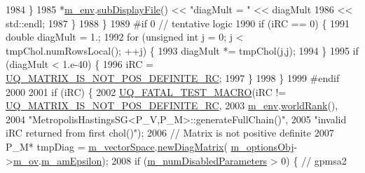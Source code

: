 \begin{DoxyCode}
{{1984             \}
1985             *\hyperlink{class_q_u_e_s_o_1_1_metropolis_hastings_s_g_ac8ea061e55b920e0c8f9bce5c3f20e52}{m\_env}.\hyperlink{class_q_u_e_s_o_1_1_base_environment_a8a0064746ae8dddfece4229b9ad374d6}{subDisplayFile}() << \textcolor{stringliteral}{"diagMult = "} << diagMult
1986                                     << std::endl;
1987           \}
1988         \}
1989 \textcolor{preprocessor}{#if 0 // tentative logic}
1990 \textcolor{preprocessor}{}        \textcolor{keywordflow}{if} (iRC == 0) \{
1991           \textcolor{keywordtype}{double} diagMult = 1.;
1992           \textcolor{keywordflow}{for} (\textcolor{keywordtype}{unsigned} \textcolor{keywordtype}{int} j = 0; j < tmpChol.numRowsLocal(); ++j) \{
1993             diagMult *= tmpChol(j,j);
1994           \}
1995           \textcolor{keywordflow}{if} (diagMult < 1.e-40) \{
1996             iRC = \hyperlink{namespace_q_u_e_s_o_a677863cd32092584175760250f39e8bb}{UQ\_MATRIX\_IS\_NOT\_POS\_DEFINITE\_RC};
1997           \}
1998         \}
1999 \textcolor{preprocessor}{#endif}
2000 \textcolor{preprocessor}{}
2001         \textcolor{keywordflow}{if} (iRC) \{
2002           \hyperlink{_defines_8h_a56d63d18d0a6d45757de47fcc06f574d}{UQ\_FATAL\_TEST\_MACRO}(iRC != 
      \hyperlink{namespace_q_u_e_s_o_a677863cd32092584175760250f39e8bb}{UQ\_MATRIX\_IS\_NOT\_POS\_DEFINITE\_RC},
2003                               \hyperlink{class_q_u_e_s_o_1_1_metropolis_hastings_s_g_ac8ea061e55b920e0c8f9bce5c3f20e52}{m\_env}.\hyperlink{class_q_u_e_s_o_1_1_base_environment_a78b57112bbd0e6dd0e8afec00b40ffa7}{worldRank}(),
2004                               \textcolor{stringliteral}{"MetropolisHastingsSG<P\_V,P\_M>::generateFullChain()"},
2005                               \textcolor{stringliteral}{"invalid iRC returned from first chol()"});
2006           \textcolor{comment}{// Matrix is not positive definite}
2007           P\_M* tmpDiag = \hyperlink{class_q_u_e_s_o_1_1_metropolis_hastings_s_g_a2ef17fbfc6a156f03bbfad044b5a75f5}{m\_vectorSpace}.\hyperlink{class_q_u_e_s_o_1_1_vector_space_a9f4ad174b63fbc0626070e0f38745e1e}{newDiagMatrix}(
      \hyperlink{class_q_u_e_s_o_1_1_metropolis_hastings_s_g_a5d0bc9f73d50d272aa6bfb5ef5939ef3}{m\_optionsObj}->\hyperlink{class_q_u_e_s_o_1_1_metropolis_hastings_s_g_options_a9d4792d9fc2dc5439b8ab489b0c236eb}{m\_ov}.\hyperlink{class_q_u_e_s_o_1_1_mh_options_values_af899c001e1bbdaf9c740d6b4dc0e13e0}{m\_amEpsilon});
2008           \textcolor{keywordflow}{if} (\hyperlink{class_q_u_e_s_o_1_1_metropolis_hastings_s_g_a43a883aa28c81ed99e5f0cd9de93889b}{m\_numDisabledParameters} > 0) \{ \textcolor{comment}{// gpmsa2}
}}
\end{DoxyCode}

